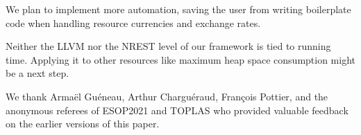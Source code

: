 \documentclass[acmsmall]{acmart}
\begin{document}
We plan to implement more automation, saving the user from writing boilerplate code when handling resource currencies and exchange rates.


Neither the LLVM nor the NREST level of our framework is 
tied to running time. 
Applying it to other resources like maximum heap space consumption might be a next step.




\begin{acks}
We thank Arma{\"{e}}l Gu{\'{e}}neau, Arthur Chargu\'{e}raud, Fran{\c{c}}ois Pottier, and the anonymous referees of ESOP2021 and TOPLAS who provided valuable feedback on the earlier versions of this paper.
%
\end{acks}



\end{document}
